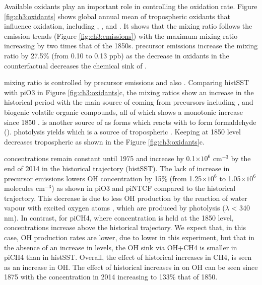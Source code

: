 Available oxidants play an important role in controlling the oxidation rate. Figure \ref{fig:ch3:oxidants} shows global annual mean of tropospheric oxidants that influence  oxidation, including , ,  and . It shows that the  mixing ratio follows the  emission trends (Figure \ref{fig:ch3:emissions}) with the maximum mixing ratio increasing by two times that of the 1850s.   precursor emissions increase the  mixing ratio by 27.5\% (from 0.10 to 0.13 ppb) as the decrease in oxidants in the counterfactual decreases the chemical sink of . 


 mixing ratio is controlled by  precursor emissions and also . Comparing histSST with piO3 in Figure \ref{fig:ch3:oxidants}c, the  mixing ratios show an increase in the historical period with the main source of  coming from  precursors including ,  and biogenic volatile organic compounds, all of which shows a monotonic increase since 1850 \citep{griffithsTroposphericOzoneCMIP62021}.  is another source of  as  forms  which reacts with  to form formaldehyde ().  photolysis yields  which is a source of tropospheric . Keeping  at 1850 level decreases tropospheric  as shown in the Figure \ref{fig:ch3:oxidants}c.


 concentrations remain constant until 1975 and increase by 0.1$\times 10^6$ cm$^{-3}$ by the end of 2014 in the historical trajectory (histSST). The lack of increase in  precursor emissions lowers OH concentration by 15\% (from 1.25$\times10^6$ to 1.05$\times10^6$ molecules cm$^{-3}$) as shown in piO3 and piNTCF compared to the historical trajectory. This decrease is due to less OH production by the reaction of water vapour with excited oxygen atoms , which are produced by  photolysis ($\lambda$ < 340 nm). In contrast, for piCH4, where  concentration is held at the 1850 level,  concentrations increase above the historical trajectory. We expect that, in this case,  OH production rates are lower, due to lower  in this experiment, but that in the absence of an increase in  levels, the OH sink via OH+CH4 is smaller in piCH4 than in histSST. Overall, the effect of historical increases in CH4, is seen as an increase in OH. The effect of historical increases in   on OH can be seen since 1875 with the  concentration in 2014 increasing to 133\% that of 1850. 


